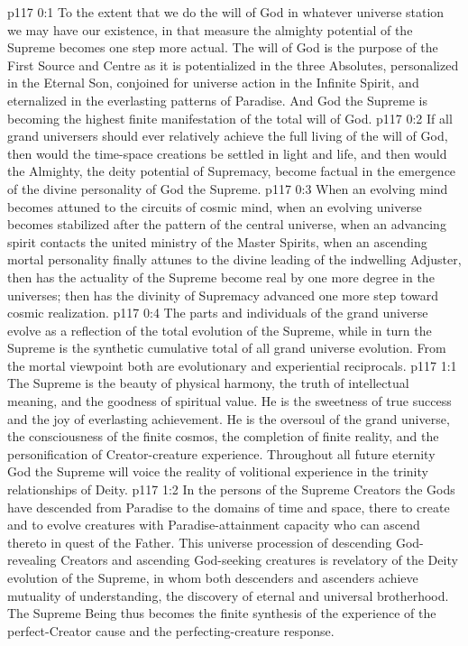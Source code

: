 \author{Mighty Messenger}
\vs p117 0:1 To the extent that we do the will of God in whatever universe station we may have our existence, in that measure the almighty potential of the Supreme becomes one step more actual. The will of God is the purpose of the First Source and Centre as it is potentialized in the three Absolutes, personalized in the Eternal Son, conjoined for universe action in the Infinite Spirit, and eternalized in the everlasting patterns of Paradise. And God the Supreme is becoming the highest finite manifestation of the total will of God.
\vs p117 0:2 If all grand universers should ever relatively achieve the full living of the will of God, then would the time\hyp{}space creations be settled in light and life, and then would the Almighty, the deity potential of Supremacy, become factual in the emergence of the divine personality of God the Supreme.
\vs p117 0:3 When an evolving mind becomes attuned to the circuits of cosmic mind, when an evolving universe becomes stabilized after the pattern of the central universe, when an advancing spirit contacts the united ministry of the Master Spirits, when an ascending mortal personality finally attunes to the divine leading of the indwelling Adjuster, then has the actuality of the Supreme become real by one more degree in the universes; then has the divinity of Supremacy advanced one more step toward cosmic realization.
\vs p117 0:4 The parts and individuals of the grand universe evolve as a reflection of the total evolution of the Supreme, while in turn the Supreme is the synthetic cumulative total of all grand universe evolution. From the mortal viewpoint both are evolutionary and experiential reciprocals.
\vs p117 1:1 The Supreme is the beauty of physical harmony, the truth of intellectual meaning, and the goodness of spiritual value. He is the sweetness of true success and the joy of everlasting achievement. He is the oversoul of the grand universe, the consciousness of the finite cosmos, the completion of finite reality, and the personification of Creator\hyp{}creature experience. Throughout all future eternity God the Supreme will voice the reality of volitional experience in the trinity relationships of Deity.
\vs p117 1:2 \pc In the persons of the Supreme Creators the Gods have descended from Paradise to the domains of time and space, there to create and to evolve creatures with Paradise\hyp{}attainment capacity who can ascend thereto in quest of the Father. This universe procession of descending God\hyp{}revealing Creators and ascending God\hyp{}seeking creatures is revelatory of the Deity evolution of the Supreme, in whom both descenders and ascenders achieve mutuality of understanding, the discovery of eternal and universal brotherhood. The Supreme Being thus becomes the finite synthesis of the experience of the perfect\hyp{}Creator cause and the perfecting\hyp{}creature response.
